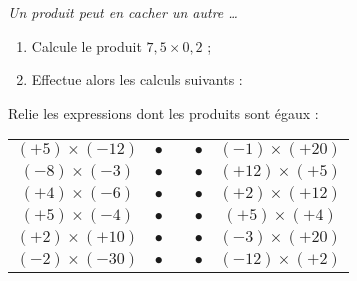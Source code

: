 \begin{exercice}
\emph{Un produit peut en cacher un autre \ldots}
\begin{enumerate}
 \item Calcule le produit $7,5 \times 0,2$ \dotfill ;
 \item Effectue alors les calculs suivants :
 \end{enumerate}
\end{exercice}


\begin{exercice}
Relie les expressions dont les produits sont égaux :
\begin{center}
 \begin{tabularx}{\linewidth}{|c|cXc|c|}
  \cline{1-1}\cline{5-5}
  \cellcolor{F3} $(+5) \times (-12)$ & \cellcolor{F2} $\bullet$ & & \cellcolor{F2} $\bullet$ & \cellcolor{F3} $(-1) \times (+20)$ \\  \cline{1-1}\cline{5-5}
  \cellcolor{F3} $(-8) \times (-3)$ & \cellcolor{F2} $\bullet$ & & \cellcolor{F2} $\bullet$ & \cellcolor{F3} $(+12) \times (+5)$ \\ \cline{1-1}\cline{5-5}
  \cellcolor{F3} $(+4) \times (-6)$ & \cellcolor{F2} $\bullet$ & & \cellcolor{F2} $\bullet$ & \cellcolor{F3} $(+2) \times (+12)$ \\ \cline{1-1}\cline{5-5}
  \cellcolor{F3} $(+5) \times (-4)$ & \cellcolor{F2} $\bullet$ & & \cellcolor{F2} $\bullet$ & \cellcolor{F3} $(+5) \times (+4)$ \\ \cline{1-1}\cline{5-5}
  \cellcolor{F3} $(+2) \times (+10)$ & \cellcolor{F2} $\bullet$ & & \cellcolor{F2} $\bullet$ & \cellcolor{F3} $(-3) \times (+20)$ \\ \cline{1-1}\cline{5-5}
  \cellcolor{F3} $(-2) \times (-30)$ & \cellcolor{F2} $\bullet$ & & \cellcolor{F2} $\bullet$ & \cellcolor{F3} $(-12) \times (+2)$ \\ \cline{1-1}\cline{5-5}
  \end{tabularx}
\end{center}
\end{exercice}


